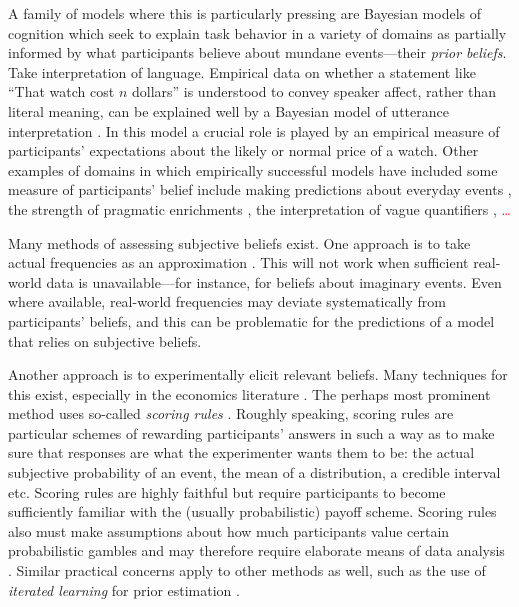 \documentclass[10pt,letterpaper]{article}
\newcommand{\citep}[1]{\cite{#1}}
\begin{document}
A family of models where this is particularly pressing are Bayesian models of cognition which
seek to explain task behavior in a variety of domains as partially informed by what participants
believe about mundane events---their \emph{prior beliefs}. Take interpretation of language. Empirical data on whether a
statement like ``That watch cost $n$ dollars'' is understood to convey speaker affect, rather
than literal meaning, can be explained well by a Bayesian model of utterance interpretation
\citep{KaoWu2014:Nonliteral-Unde}. In this model a crucial role is played by
an empirical measure of participants' expectations about the likely or normal price of a
watch. 
Other examples of domains in which empirically successful models have included some
measure of participants' belief include making predictions about everyday events 
\citep{GriffithsTenenbaum2006:Optimal-Predict}, the strength of pragmatic enrichments
\citep{DegenTessler2015:Wonky-worlds:-L}, the interpretation of vague quantifiers
\citep{SchollerFranke2015:Semantic-values}, \textcolor{red}{ \dots }


Many methods of assessing subjective beliefs exist. One approach is to take actual frequencies
as an approximation \citep{GriffithsTenenbaum2006:Optimal-Predict}. This will not
work when sufficient real-world data is unavailable---for instance, for beliefs about imaginary events. 
Even where available, real-world
frequencies may deviate systematically from participants' beliefs, and this can be problematic for
the predictions of a model that relies on subjective beliefs.

Another approach is to experimentally elicit relevant beliefs. Many techniques for this
exist, especially in the economics literature
\citep{MorganHenrion1990:Uncertainty:-A-,Manski2004:Measuring-Expec,SchlagTremewan2014:A-penny-for-you,AndersenFountain2014:Estimating-Subj}. The
perhaps most prominent method uses so-called \emph{scoring rules}
\citep{Savage1971:Elicitation-of-,SchlagTremewan2014:A-penny-for-you}. Roughly speaking,
scoring rules are particular schemes of rewarding participants' answers in such a way as to
make sure that responses are what the experimenter wants them to be: the actual subjective probability of an
event, the mean of a distribution, a credible interval etc. Scoring rules are highly faithful
but require participants to become sufficiently familiar with the (usually probabilistic)
payoff scheme. Scoring rules also must make assumptions about how much participants value
certain probabilistic gambles and may therefore require elaborate means of data analysis
\citep{AndersenFountain2014:Estimating-Subj}. Similar practical concerns apply to other methods
as well, such as the use of \emph{iterated learning} for prior estimation
\citep{LewandowskyGriffiths2009:The-Wisdom-of-I}.
\end{document}
